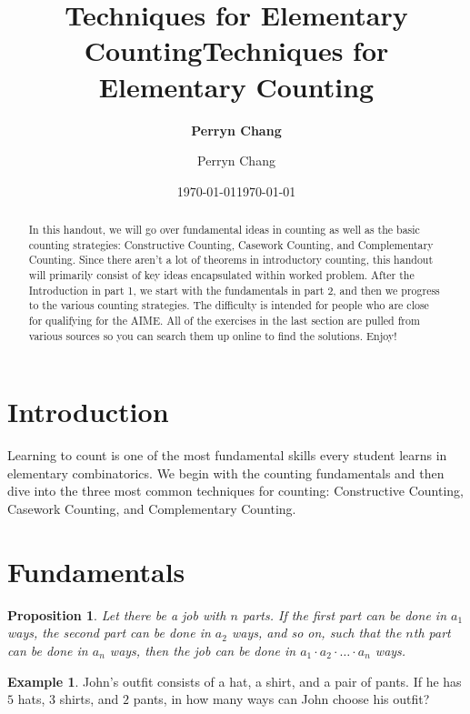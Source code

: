\documentclass[l1pt]{article}
\title{\textbf{Techniques for Elementary Counting}}
\author{\textbf{Perryn Chang}}
\date{\today}
\title{Techniques for Elementary Counting}
\author{Perryn Chang}
\date{\today}
\theoremstyle{plain}
\newtheorem{prop}[thm]{Proposition}
\theoremstyle{definition}
\newtheorem{example}[thm]{Example}
\theoremstyle{remark}
\begin{document}
\maketitle

\begin{abstract}
In this handout, we will go over fundamental ideas in counting as well as the basic counting strategies: Constructive Counting, Casework Counting, and Complementary Counting. Since there aren't a lot of theorems in introductory counting, this handout will primarily consist of key ideas encapsulated within worked problem. After the Introduction in part 1, we start with the fundamentals in part 2, and then we progress to the various counting strategies. The difficulty is intended for people who are close for qualifying for the AIME. All of the exercises in the last section are pulled from various sources so you can search them up online to find the solutions. Enjoy!
\end{abstract}

\tableofcontents

\eject

\section{Introduction}

Learning to count is one of the most fundamental skills every student learns in elementary combinatorics. We begin with the counting fundamentals and then dive into the three most common techniques for counting: Constructive Counting, Casework Counting, and Complementary Counting.

\section{Fundamentals}
\label{sec:examples}



\begin{mdframed}

\begin{prop}
Let there be a job with $n$ parts. If the first part can be done in $a_1$ ways, the second part can be done in $a_2$ ways, and so on, such that the $n$th part can be done in $a_n$ ways, then the job can be done in $a_1 \cdot a_2 \cdot \dots \cdot a_n$ ways.

\end{prop}
\end{mdframed}

\begin{example}
John's outfit consists of a hat, a shirt, and a pair of pants. If he has $5$ hats, $3$ shirts, and $2$ pants, in how many ways can John choose his outfit?
\end{example}
\end{document}
